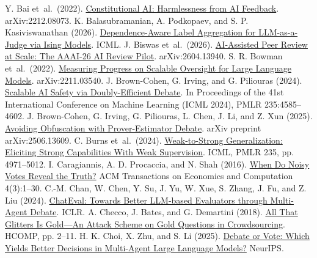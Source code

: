 \begin{thebibliography}{}
 Y. Bai et~al.\ (2022). \href{https://arxiv.org/abs/2212.08073}{Constitutional AI: Harmlessness from AI Feedback}. arXiv:2212.08073.
 K. Balasubramanian, A. Podkopaev, and S. P. Kasiviswanathan (2026). \href{https://arxiv.org/abs/2601.22336}{Dependence-Aware Label Aggregation for LLM-as-a-Judge via Ising Models}. ICML.
 J. Biswas et~al.\ (2026). \href{https://arxiv.org/abs/2604.13940}{AI-Assisted Peer Review at Scale: The AAAI-26 AI Review Pilot}. arXiv:2604.13940.
 S. R. Bowman et~al.\ (2022). \href{https://arxiv.org/abs/2211.03540}{Measuring Progress on Scalable Oversight for Large Language Models}. arXiv:2211.03540.
 J. Brown-Cohen, G. Irving, and G. Piliouras (2024). \href{https://proceedings.mlr.press/v235/brown-cohen24a.html}{Scalable AI Safety via Doubly-Efficient Debate}. In Proceedings of the 41st International Conference on Machine Learning (ICML 2024), PMLR 235:4585--4602.
 J. Brown-Cohen, G. Irving, G. Piliouras, L. Chen, J. Li, and Z. Xun (2025). \href{https://arxiv.org/abs/2506.13609}{Avoiding Obfuscation with Prover-Estimator Debate}. arXiv preprint arXiv:2506.13609.
 C. Burns et~al.\ (2024). \href{https://proceedings.mlr.press/v235/burns24b.html}{Weak-to-Strong Generalization: Eliciting Strong Capabilities With Weak Supervision}. ICML, PMLR 235, pp. 4971--5012.
 I. Caragiannis, A. D. Procaccia, and N. Shah (2016). \href{https://doi.org/10.1145/2892565}{When Do Noisy Votes Reveal the Truth?} ACM Transactions on Economics and Computation 4(3):1--30.
 C.-M. Chan, W. Chen, Y. Su, J. Yu, W. Xue, S. Zhang, J. Fu, and Z. Liu (2024). \href{https://openreview.net/forum?id=FQepisCUWu}{ChatEval: Towards Better LLM-based Evaluators through Multi-Agent Debate}. ICLR.
 A. Checco, J. Bates, and G. Demartini (2018). \href{https://doi.org/10.1609/hcomp.v6i1.13332}{All That Glitters Is Gold---An Attack Scheme on Gold Questions in Crowdsourcing}. HCOMP, pp. 2--11.
 H. K. Choi, X. Zhu, and S. Li (2025). \href{https://arxiv.org/abs/2508.17536}{Debate or Vote: Which Yields Better Decisions in Multi-Agent Large Language Models?} NeurIPS.

\end{thebibliography}
